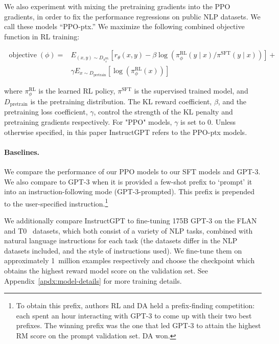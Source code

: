 \documentclass{article}
\begin{document}
We also experiment with mixing the pretraining gradients into the PPO gradients, in order to fix the performance regressions on public NLP datasets. We call these models ``PPO-ptx.''  We maximize the following combined objective function in RL training:

\begin{equation} \label{eq2}
\begin{split}
\operatorname{objective}\left(\phi\right)= & E_{\left(x, y\right) \sim D_{\pi_{\phi}^{\mathrm{RL}}}}\left[r_{\theta}(x, y)-\beta \log \left(\pi_{\phi}^{\mathrm{RL}}(y \mid x) / \pi^{\mathrm{SFT}}(y \mid x)\right)\right] + \\
 & \gamma E_{x \sim D_\textrm{pretrain}}\left[\log(\pi_{\phi}^{\mathrm{RL}}(x))\right]
\end{split}
\end{equation}

where \( \pi_{\phi}^{\mathrm{RL}}\) is the learned RL policy, \( \pi^{\mathrm{SFT}}\) is the supervised trained model, and \(D_\textrm{pretrain} \) is the pretraining distribution. The KL reward coefficient, \( \beta \), and the pretraining loss coefficient, \( \gamma \), control the strength of the KL penalty and pretraining gradients respectively. For "PPO" models, \( \gamma \) is set to 0. Unless otherwise specified, in this paper InstructGPT refers to the PPO-ptx models.

\paragraph{Baselines.} We compare the performance of our PPO models to our SFT models and GPT-3. We also compare to GPT-3 when it is provided a few-shot prefix to ‘prompt' it into an instruction-following mode (GPT-3-prompted). This prefix is prepended to the user-specified instruction.\footnote{To obtain this prefix, authors RL and DA held a prefix-finding competition: each spent an hour interacting with GPT-3 to come up with their two best prefixes. The winning prefix was the one that led GPT-3 to attain the highest RM score on the prompt validation set. DA won.}

We additionally compare InstructGPT to fine-tuning 175B GPT-3 on the FLAN~\citep{wei2021finetuned} and T0~\citep{sanh2021multitask} datasets, which both consist of a variety of NLP tasks, combined with natural language instructions for each task (the datasets differ in the NLP datasets included, and the style of instructions used). 
We fine-tune them on approximately 1~million examples respectively and choose the checkpoint which obtains the highest reward model score on the validation set. See Appendix~\ref{apdx:model-details} for more training details.
\end{document}
